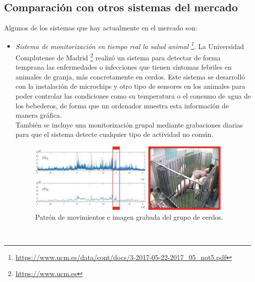 \subsection{Comparación con otros sistemas del mercado}
Algunos de los sistemas que hay actualmente en el mercado son:
\begin{itemize}
 \item \textit{Sistema de monitorización en tiempo real la salud animal \footnote{\url{https://www.ucm.es/data/cont/docs/3-2017-05-22-2017_05_not5.pdf}}.} La Universidad Complutense de Madrid \footnote{\url{https://www.ucm.es}} realizó un sistema para detectar de forma temprana las enfermedades o infecciones que tienen síntomas febriles en animales de granja, más concretamente en cerdos. Este sistema se desarrolló con la instalación de microchips y otro tipo de sensores en los animales para poder controlar las condiciones como su temperatura o el consumo de agua de los bebederos, de forma que un ordenador muestra esta información de manera gráfica.\\
También se incluye una monitorización grupal mediante grabaciones diarias para que el sistema detecte cualquier tipo de actividad no común. 
\begin{figure} [h!]
  \begin{center}
    \includegraphics[width=10cm]{figs/ucm}
  \end{center}
  \caption{Patrón de movimientos e imagen grabada del grupo de cerdos.}
  \label{fig:uc}
\end{figure}\


\end{itemize}
